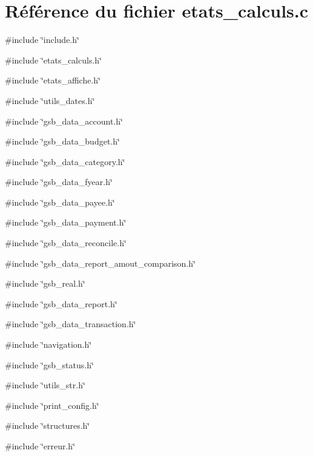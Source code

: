 \section{Référence du fichier etats\_\-calculs.c}
\label{etats__calculs_8c}
{\ttfamily \#include \char`\"{}include.h\char`\"{}}\par
{\ttfamily \#include \char`\"{}etats\_\-calculs.h\char`\"{}}\par
{\ttfamily \#include \char`\"{}etats\_\-affiche.h\char`\"{}}\par
{\ttfamily \#include \char`\"{}utils\_\-dates.h\char`\"{}}\par
{\ttfamily \#include \char`\"{}gsb\_\-data\_\-account.h\char`\"{}}\par
{\ttfamily \#include \char`\"{}gsb\_\-data\_\-budget.h\char`\"{}}\par
{\ttfamily \#include \char`\"{}gsb\_\-data\_\-category.h\char`\"{}}\par
{\ttfamily \#include \char`\"{}gsb\_\-data\_\-fyear.h\char`\"{}}\par
{\ttfamily \#include \char`\"{}gsb\_\-data\_\-payee.h\char`\"{}}\par
{\ttfamily \#include \char`\"{}gsb\_\-data\_\-payment.h\char`\"{}}\par
{\ttfamily \#include \char`\"{}gsb\_\-data\_\-reconcile.h\char`\"{}}\par
{\ttfamily \#include \char`\"{}gsb\_\-data\_\-report\_\-amout\_\-comparison.h\char`\"{}}\par
{\ttfamily \#include \char`\"{}gsb\_\-real.h\char`\"{}}\par
{\ttfamily \#include \char`\"{}gsb\_\-data\_\-report.h\char`\"{}}\par
{\ttfamily \#include \char`\"{}gsb\_\-data\_\-transaction.h\char`\"{}}\par
{\ttfamily \#include \char`\"{}navigation.h\char`\"{}}\par
{\ttfamily \#include \char`\"{}gsb\_\-status.h\char`\"{}}\par
{\ttfamily \#include \char`\"{}utils\_\-str.h\char`\"{}}\par
{\ttfamily \#include \char`\"{}print\_\-config.h\char`\"{}}\par
{\ttfamily \#include \char`\"{}structures.h\char`\"{}}\par
{\ttfamily \#include \char`\"{}erreur.h\char`\"{}}\par
